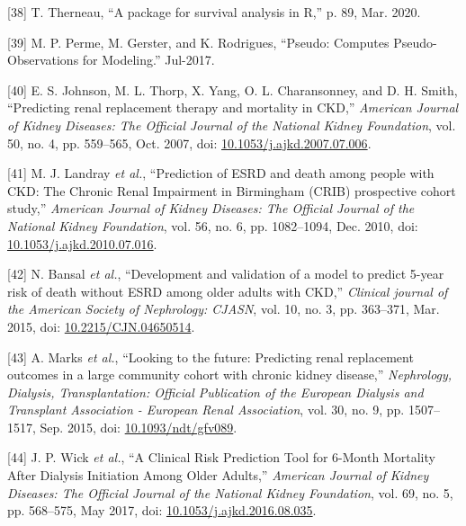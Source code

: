 \documentclass[12pt,PhD,twoside,openright]{muthesis}
\newenvironment{cslreferences}%
  {}%
  {\par}
\begin{document}
\begin{cslreferences}
\leavevmode\hypertarget{ref-therneau_package_2020}{}%
{[}38{]} T. Therneau, ``A package for survival analysis in R,'' p. 89, Mar. 2020.

\leavevmode\hypertarget{ref-perme_pseudo_2017}{}%
{[}39{]} M. P. Perme, M. Gerster, and K. Rodrigues, ``Pseudo: Computes Pseudo-Observations for Modeling.'' Jul-2017.

\leavevmode\hypertarget{ref-johnson_predicting_2007}{}%
{[}40{]} E. S. Johnson, M. L. Thorp, X. Yang, O. L. Charansonney, and D. H. Smith, ``Predicting renal replacement therapy and mortality in CKD,'' \emph{American Journal of Kidney Diseases: The Official Journal of the National Kidney Foundation}, vol. 50, no. 4, pp. 559--565, Oct. 2007, doi: \href{https://doi.org/10.1053/j.ajkd.2007.07.006}{10.1053/j.ajkd.2007.07.006}.

\leavevmode\hypertarget{ref-landray_prediction_2010}{}%
{[}41{]} M. J. Landray \emph{et al.}, ``Prediction of ESRD and death among people with CKD: The Chronic Renal Impairment in Birmingham (CRIB) prospective cohort study,'' \emph{American Journal of Kidney Diseases: The Official Journal of the National Kidney Foundation}, vol. 56, no. 6, pp. 1082--1094, Dec. 2010, doi: \href{https://doi.org/10.1053/j.ajkd.2010.07.016}{10.1053/j.ajkd.2010.07.016}.

\leavevmode\hypertarget{ref-bansal_development_2015}{}%
{[}42{]} N. Bansal \emph{et al.}, ``Development and validation of a model to predict 5-year risk of death without ESRD among older adults with CKD,'' \emph{Clinical journal of the American Society of Nephrology: CJASN}, vol. 10, no. 3, pp. 363--371, Mar. 2015, doi: \href{https://doi.org/10.2215/CJN.04650514}{10.2215/CJN.04650514}.

\leavevmode\hypertarget{ref-marks_looking_2015}{}%
{[}43{]} A. Marks \emph{et al.}, ``Looking to the future: Predicting renal replacement outcomes in a large community cohort with chronic kidney disease,'' \emph{Nephrology, Dialysis, Transplantation: Official Publication of the European Dialysis and Transplant Association - European Renal Association}, vol. 30, no. 9, pp. 1507--1517, Sep. 2015, doi: \href{https://doi.org/10.1093/ndt/gfv089}{10.1093/ndt/gfv089}.

\leavevmode\hypertarget{ref-wick_clinical_2017}{}%
{[}44{]} J. P. Wick \emph{et al.}, ``A Clinical Risk Prediction Tool for 6-Month Mortality After Dialysis Initiation Among Older Adults,'' \emph{American Journal of Kidney Diseases: The Official Journal of the National Kidney Foundation}, vol. 69, no. 5, pp. 568--575, May 2017, doi: \href{https://doi.org/10.1053/j.ajkd.2016.08.035}{10.1053/j.ajkd.2016.08.035}.


\end{cslreferences}
\end{document}
